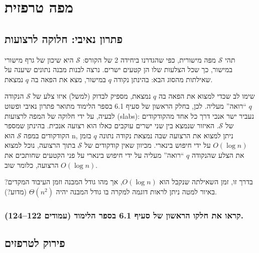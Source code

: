 \documentclass[
]{book}
\begin{document}
\hypertarget{trapezoidal-map}{%
\section{מפה טרפזית}\label{trapezoidal-map}}

\hypertarget{naive-sol}{%
\subsection{פתרון נאיבי: חלוקה לרצועות}\label{naive-sol}}

תהי \(\mathcal{S}\) מפה מישורית, כפי שהגדרנו ביחידה 2 של הקורס: \(\mathcal{S}\) היא שיכון של גרף מישורי במישור, כך שכל הצלעות שלו הן קטעים ישרים.
נרצה לבנות מבנה נתונים שיענה על שאילתות מהסוג הבא: בהינתן נקודה \(q\) במישור, מצא את הפאה בה \(q\) נמצאת.

שימו לב שכדי למצוא את הפאה בה \(q\) נמצאת, מספיק לבדוק (למשל) איזו צלע של \(\mathcal{S}\) הנקודה \(q\) ``רואה'' מעליה.
לכן, בחלק הראשון של סעיף 6.1 בספר הלימוד מתואר פתרון נאיבי ופשוט לבעיה, על ידי חלוקה של המפה לרצועות (slabs): נעביר ישר אנכי דרך כל אחד מהקודקודים של \(\mathcal{S}\). האיזור שנמצא בין שני ישרים עוקבים כאלו הוא רצועה אנכית.
בהינתן שמספר הקודקודים במפה \(\mathcal{S}\) הוא n, ניתן למצוא את הרצועה שבה נמצאת נקודה נתונה \(q\) בזמן \(O (\log n )\) על ידי חיפוש בינארי.
מכיוון שאין קודקודים של \(\mathcal{S}\) בתוך הרצועה, נוכל למצוא את הצלע שהנקודה \(q\) ``רואה'' מעליה על ידי חיפוש בינארי על פני הקטעים שחותכים את הרצועה, כלומר שוב \(O (\log n )\).

בדרך זו, זמן השאילתה שנקבל הוא \(O (\log n )\), אך מהו גודל המבנה וזמן העיבוד המקדים?
באיור למטה ניתן לראות דוגמה למקרה בו גודל המבנה יהיה \(\Theta ( n^2 )\) (מדוע?).

\hypertarget{ux5e7ux5e8ux5d0ux5d5-ux5d0ux5ea-ux5d7ux5dcux5e7ux5d5-ux5d4ux5e8ux5d0ux5e9ux5d5ux5df-ux5e9ux5dc-ux5e1ux5e2ux5d9ux5e3-6.1-ux5d1ux5e1ux5e4ux5e8-ux5d4ux5dcux5d9ux5deux5d5ux5d3-ux5e2ux5deux5d5ux5d3ux5d9ux5dd-122124.}{%
\subsubsection*{קראו את חלקו הראשון של סעיף 6.1 בספר הלימוד (עמודים 122--124).}\label{ux5e7ux5e8ux5d0ux5d5-ux5d0ux5ea-ux5d7ux5dcux5e7ux5d5-ux5d4ux5e8ux5d0ux5e9ux5d5ux5df-ux5e9ux5dc-ux5e1ux5e2ux5d9ux5e3-6.1-ux5d1ux5e1ux5e4ux5e8-ux5d4ux5dcux5d9ux5deux5d5ux5d3-ux5e2ux5deux5d5ux5d3ux5d9ux5dd-122124.}}

\hypertarget{ux5e4ux5d9ux5e8ux5d5ux5e7-ux5dcux5d8ux5e8ux5e4ux5d6ux5d9ux5dd}{%
\subsection{פירוק לטרפזים}\label{ux5e4ux5d9ux5e8ux5d5ux5e7-ux5dcux5d8ux5e8ux5e4ux5d6ux5d9ux5dd}}
\end{document}
